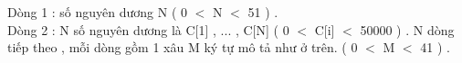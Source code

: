 Dòng 1 : số nguyên dương N ( 0 $<$ N $<$ 51 ) .   
\\   Dòng 2 : N số nguyên dương là C[1] , ... , C[N] ( 0 $<$ C[i] $<$ 50000 ) . N dòng tiếp theo , mỗi dòng gồm 1 xâu M ký tự mô tả như ở trên. ( 0 $<$ M $<$ 41 ) .  

\